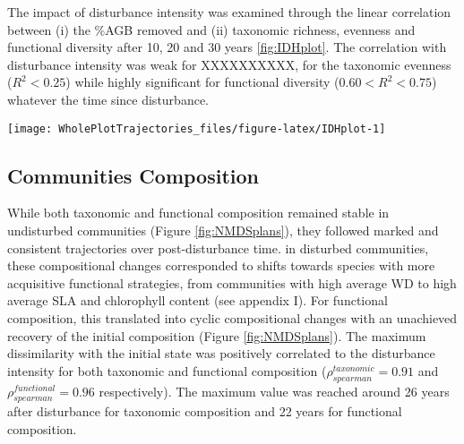 \documentclass[fleqn,10pt]{ArtEcoFoG} %
\begin{document}
The impact of disturbance intensity was examined through the linear
correlation between (i) the \%AGB removed and (ii) taxonomic richness,
evenness and functional diversity after 10, 20 and 30 years
\ref{fig:IDHplot}. The correlation with disturbance intensity was weak
for XXXXXXXXXX, for the taxonomic evenness (\(R^2<0.25\)) while highly
significant for functional diversity (\(0.60<R^2<0.75\)) whatever the
time since disturbance.

\begin{figure*}

{\centering \texttt{[image: WholePlotTrajectories\_files/figure-latex/IDHplot-1]} 

}

\caption{Upper panels, Trajectories of the taxonomic evenness (Simpson diversity) \textbf{(a)} and Rao functional diversity \textbf{(b)} over 30 years after disturbance. Colors are treatments: green (control), blue (T1), orange (T2), red (T3) with shaded areas the credibility intervals. Lower panels, Relationship between the initial \%AGB removed and Simpson \textbf{(c)} and Rao \textbf{(d)} diversities 10, 20 and 30 years after disturbance.}\label{fig:IDHplot}
\end{figure*}

\subsection{Communities Composition}\label{communities-composition}

While both taxonomic and functional composition remained stable in
undisturbed communities (Figure \ref{fig:NMDSplans}), they followed
marked and consistent trajectories over post-disturbance time. in
disturbed communities, these compositional changes corresponded to
shifts towards species with more acquisitive functional strategies, from
communities with high average WD to high average SLA and chlorophyll
content (see appendix I). For functional composition, this translated
into cyclic compositional changes with an unachieved recovery of the
initial composition (Figure \ref{fig:NMDSplans}). The maximum
dissimilarity with the initial state was positively correlated to the
disturbance intensity for both taxonomic and functional composition
(\(\rho_{spearman}^{taxonomic}=0.91\) and
\(\rho_{spearman}^{functional}=0.96\) respectively). The maximum value
was reached around 26 years after disturbance for taxonomic composition
and 22 years for functional composition.
\end{document}
